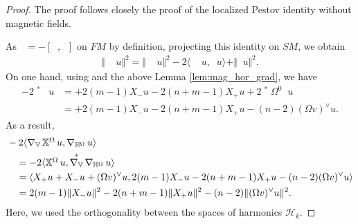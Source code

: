 \documentclass[12pt]{amsart}
\numberwithin{numbering}{section}
\theoremstyle{plain}
\theoremstyle{definition}
\theoremstyle{remark}
\numberwithin{equation}{section}
\DeclareMathOperator{\nv}{\nabla_{\mathbb{V}}}
\DeclareMathOperator{\nhs}{\nabla_{\mathbb{H}^{\mg}}}
\DeclareMathOperator{\xs}{\mathbb{X}^{\mg}}
\DeclareMathOperator{\mg}{\Omega}
\begin{document}
\begin{proof}
The proof follows closely the proof of the localized Pestov identity without magnetic fields. 

As $\nhs = - [\xs, \nv]$ on $FM$ by definition, projecting this identity on $SM$, we obtain 
\begin{align}
\Vert \xs \nv u \Vert^2 
= \Vert \nv \xs u \Vert^2 - 2 \langle \nv \xs u, \nhs u \rangle + \Vert \nhs u \Vert^2. \label{eq:loc_pestov_0}
\end{align}
On one hand, using \cite[Lemma 14.3.2]{lefeuvre2024microlocal} and the above Lemma \ref{lem:mag_hor_grad}, we have
\begin{align*}
-2 \nv^* \nhs u &= +2(m-1) X_- u - 2(n+m-1) X_+ u + 2 \nv^* \Omega^0 \nv u \\
&= +2(m-1) X_- u - 2(n+m-1) X_+ u - (n-2) (\Omega v)^\vee u.
\end{align*} 
As a result,
\begin{align}
&-2 \langle \nv \xs u, \nhs u \rangle \notag \\
&\quad = -2 \langle \xs u, \nv^* \nhs u \rangle \notag \\
&\quad = \langle X_+ u + X_- u + (\Omega v)^\vee u, 2(m-1) X_- u - 2 (n+m-1) X_+ u - (n-2) (\Omega v)^\vee u \rangle \notag \\
&\quad = 2(m-1) \Vert X_- u \Vert^2 - 2(n+m-1) \Vert X_+ u \Vert^2 - (n-2) \Vert (\Omega v)^\vee u \Vert^2. \label{eq:loc_pestov_1}
\end{align}
Here, we used the orthogonality between the spaces of harmonics $\mathcal{H}_k$.


\end{proof}
\end{document}
